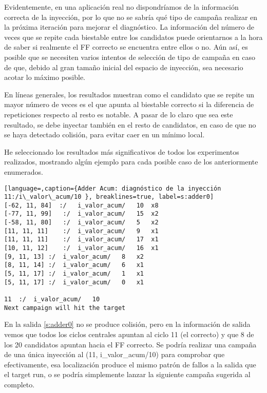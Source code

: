 Evidentemente, en una aplicación real no dispondríamos de la información correcta
de la inyección, por lo que no se sabría qué tipo de campaña realizar en la
próxima iteración para mejorar el diagnóstico. La información del número de veces
que se repite cada biestable entre los candidatos puede orientarnos a la hora de
saber si realmente el \gls{FF} correcto se encuentra entre ellos o no. Aún
así, es posible que se necesiten varios intentos de selección de tipo de campaña
en caso de que, debido al gran tamaño inicial del espacio de inyección, sea
necesario acotar lo máximo posible.

En líneas generales, los resultados muestran como el candidato que se repite un
mayor número de veces es el que apunta al biestable correcto si la diferencia
de repeticiones respecto al resto es notable. A pasar de lo claro
que sea este resultado, se debe inyectar también en el resto de candidatos, en caso
de que no se haya detectado colisión, para evitar caer en un mínimo local.

He seleccionado los resultados más significativos de todos los experimentos
realizados, mostrando algún ejemplo para cada posible caso de los anteriormente
enumerados.

\begin{lstlisting}[language=,caption={Adder Acum: diagnóstico de la inyección
11:/i\_valor\_acum/10 }, breaklines=true, label=s:adder0]
[-62, 11, 84]  :/	i_valor_acum/	10	x8
[-77, 11, 99]	:/	i_valor_acum/	15	x2
[-58, 11, 80]	:/	i_valor_acum/	5	x2
[11, 11, 11]	:/	i_valor_acum/	9	x1
[11, 11, 11]	:/	i_valor_acum/	17	x1
[10, 11, 12]	:/	i_valor_acum/	16	x1
[9, 11, 13]	:/	i_valor_acum/	8	x2
[8, 11, 14]	:/	i_valor_acum/	6	x1
[5, 11, 17]	:/	i_valor_acum/	1	x1
[5, 11, 17]	:/	i_valor_acum/	0	x1

11	:/	i_valor_acum/	10
Next campaign will hit the target
\end{lstlisting}

En la salida \ref{s:adder0} no se produce colisión, pero en la información de 
salida vemos que todos los ciclos centrales apuntan al ciclo 11 (el correcto) y 
que 8 de los 20 candidatos apuntan hacia el \gls{FF} correcto.
Se podría realizar una campaña de una única inyección al (11, i\_valor\_acum/10) 
para comprobar que efectivamente, esa localización produce el mismo patrón de
fallos a la salida que el target run, o se podría simplemente lanzar la siguiente
campaña sugerida al completo.

